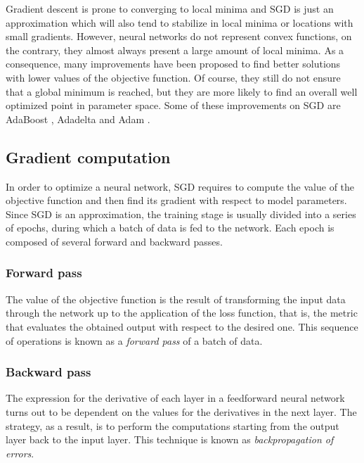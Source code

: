 Gradient descent is prone to converging to local minima and SGD is just an approximation which will also tend to stabilize in local minima or locations with small gradients. However, neural networks do not represent convex functions, on the contrary, they almost always present a large amount of local minima. As a consequence, many improvements have been proposed to find better solutions with lower values of the objective function. Of course, they still do not ensure that a global minimum is reached, but they are more likely to find an overall well optimized point in parameter space. Some of these improvements on SGD are AdaBoost , Adadelta  and Adam .

\subsection{Gradient computation}

In order to optimize a neural network, SGD requires to compute the value of the objective function and then find its gradient with respect to model parameters. Since SGD is an approximation,  
the training stage is usually divided into a series of epochs, during which a batch of data is fed to the network. Each epoch is composed of several forward and backward passes. 


\subsubsection{Forward pass}

The value of the objective function is the result of transforming the input data through the network up to the application of the loss function, that is, the metric that evaluates the obtained output with respect to the desired one. This sequence of operations is known as a \textit{forward pass} of a batch of data. 


\subsubsection{Backward pass}

The expression for the derivative of each layer in a feedforward neural network turns out to be dependent on the values for the derivatives in the next layer. The strategy, as a result, is to perform the computations starting from the output layer back to the input layer. This technique is known as \textit{backpropagation of errors}. 

